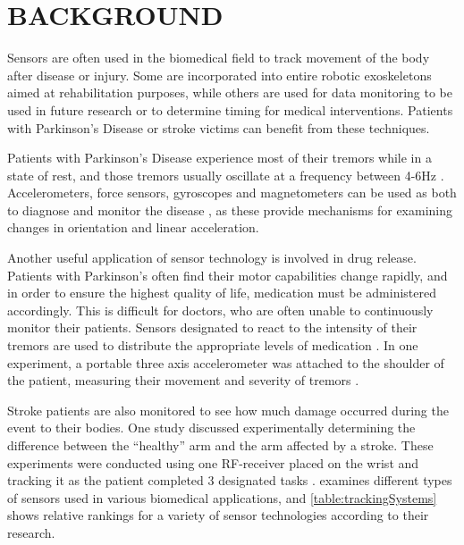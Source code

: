 \documentclass[letterpaper, 10 pt, conference]{ieeeconf}  %
\begin{document}
\section{BACKGROUND}
Sensors are often used in the biomedical field to track movement of the body after disease or injury. Some are incorporated into entire robotic exoskeletons aimed at rehabilitation purposes, while others are used for data monitoring to be used in future research or to determine timing for medical interventions. Patients with Parkinson’s Disease or stroke victims can benefit from these techniques.

Patients with Parkinson’s Disease experience most of their tremors while in a state of rest, and those tremors usually oscillate at a frequency between 4-6Hz \cite{Perumal}. Accelerometers, force sensors, gyroscopes and magnetometers can be used as both to diagnose and monitor the disease \cite{Perumal}, as these provide mechanisms for examining changes in orientation and linear acceleration.

Another useful application of sensor technology is involved in drug release. Patients with Parkinson’s often find their motor capabilities change rapidly, and in order to ensure the highest quality of life, medication must be administered accordingly. This is difficult for doctors, who are often unable to continuously monitor their patients. Sensors designated to react to the intensity of their tremors are used to distribute the appropriate levels of medication \cite{Patel}. In one experiment, a portable three axis accelerometer was attached to the shoulder of the patient, measuring their movement and severity of tremors \cite{Patel}.

Stroke patients are also monitored to see how much damage occurred during the event to their bodies. One study discussed experimentally determining the difference between the “healthy” arm and the arm affected by a stroke. These experiments were conducted using one RF-receiver placed on the wrist and tracking it as the patient completed 3 designated tasks \cite{Sokal}.
\cite{Zhou} examines different types of sensors used in various biomedical applications, and \autoref{table:trackingSystems} shows relative rankings for a variety of sensor technologies according to their research.
\end{document}

